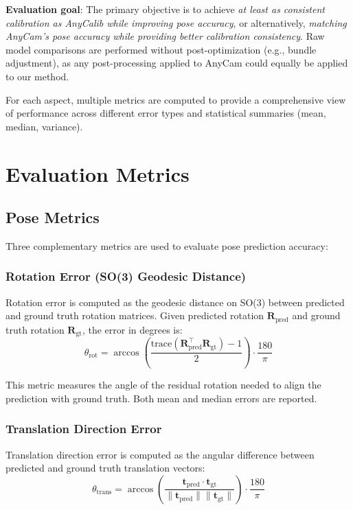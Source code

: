 \textbf{Evaluation goal}: The primary objective is to achieve \emph{at least as consistent calibration as AnyCalib while improving pose accuracy}, or alternatively, \emph{matching AnyCam's pose accuracy while providing better calibration consistency}. Raw model comparisons are performed without post-optimization (e.g., bundle adjustment), as any post-processing applied to AnyCam could equally be applied to our method.

For each aspect, multiple metrics are computed to provide a comprehensive view of performance across different error types and statistical summaries (mean, median, variance).

\section{Evaluation Metrics}\label{sec:eval-metrics}

\subsection{Pose Metrics}\label{sec:pose-metrics}

Three complementary metrics are used to evaluate pose prediction accuracy:

\subsubsection{Rotation Error (SO(3) Geodesic Distance)}

Rotation error is computed as the geodesic distance on SO(3) between predicted and ground truth rotation matrices. Given predicted rotation $\mathbf{R}_{\text{pred}}$ and ground truth rotation $\mathbf{R}_{\text{gt}}$, the error in degrees is:
\begin{equation}
    \theta_{\text{rot}} = \arccos\left(\frac{\text{trace}(\mathbf{R}_{\text{pred}}^\top \mathbf{R}_{\text{gt}}) - 1}{2}\right) \cdot \frac{180}{\pi}
\end{equation}

This metric measures the angle of the residual rotation needed to align the prediction with ground truth. Both mean and median errors are reported.

\subsubsection{Translation Direction Error}

Translation direction error is computed as the angular difference between predicted and ground truth translation vectors:
\begin{equation}
    \theta_{\text{trans}} = \arccos\left(\frac{\mathbf{t}_{\text{pred}} \cdot \mathbf{t}_{\text{gt}}}{\|\mathbf{t}_{\text{pred}}\| \|\mathbf{t}_{\text{gt}}\|}\right) \cdot \frac{180}{\pi}
\end{equation}


